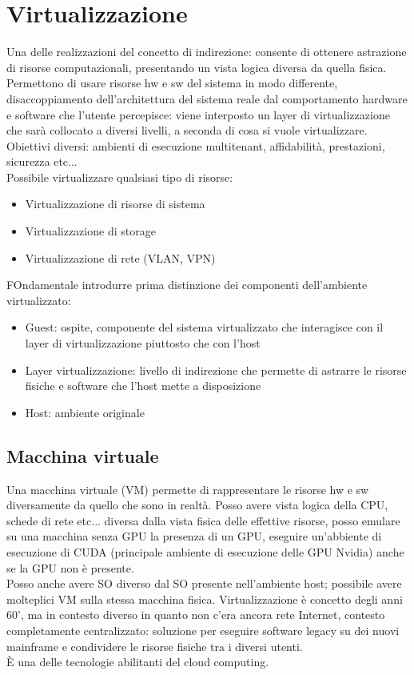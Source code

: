 \documentclass{article}
\begin{document}
\section{Virtualizzazione}
Una delle realizzazioni del concetto di indirezione: consente di ottenere astrazione di risorse computazionali, presentando un vista logica diversa da quella fisica. Permettono di usare risorse hw e sw del sistema in modo differente, disaccoppiamento dell'architettura del sistema reale dal comportamento hardware e software che l'utente percepisce: viene interposto un layer di virtualizzazione che sarà collocato a diversi livelli, a seconda di cosa si vuole virtualizzare. Obiettivi diversi: ambienti di esecuzione multitenant, affidabilità, prestazioni, sicurezza etc...\\ Possibile virtualizzare qualsiasi tipo di risorse:
\begin{itemize}
\item Virtualizzazione di risorse di sistema
\item Virtualizzazione di storage
\item Virtualizzazione di rete (VLAN, VPN)
\end{itemize}
FOndamentale introdurre prima distinzione dei componenti dell'ambiente virtualizzato:
\begin{itemize}
\item Guest: ospite, componente del sistema virtualizzato che interagisce con il layer di virtualizzazione piuttosto che con l'host
\item Layer virtualizzazione: livello di indirezione che permette di astrarre le risorse fisiche e software che l'host mette a disposizione
\item Host: ambiente originale
\end{itemize}
\subsection{Macchina virtuale}
Una macchina virtuale (VM) permette di rappresentare le risorse hw e sw diversamente da quello che sono in realtà. Posso avere vista logica della CPU, schede di rete etc... diversa dalla vista fisica delle effettive risorse, posso emulare su una macchina senza GPU la presenza di un GPU, eseguire un'abbiente di esecuzione di CUDA (principale ambiente di esecuzione delle GPU Nvidia) anche se la GPU non è presente.\\ Posso anche avere SO diverso dal SO presente nell'ambiente host; possibile avere molteplici VM sulla stessa macchina fisica. Virtualizzazione è concetto degli anni 60', ma in contesto diverso in quanto non c'era ancora rete Internet, contesto completamente centralizzato: soluzione per eseguire software legacy su dei nuovi mainframe e condividere le risorse fisiche tra i diversi utenti.\\ È una delle tecnologie abilitanti del cloud computing. 
\end{document}
